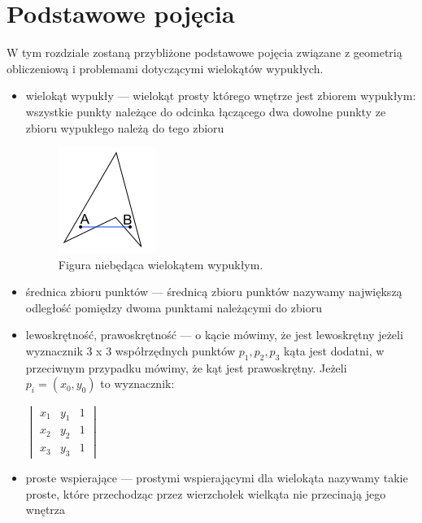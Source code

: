 \documentclass{article}
\begin{document}
\section{Podstawowe pojęcia}
W tym rozdziale zostaną przybliżone podstawowe pojęcia związane z
geometrią obliczeniową i problemami dotyczącymi wielokątów wypukłych.

\begin{itemize}
\item{wielokąt wypukły} --- wielokąt prosty którego wnętrze jest
  zbiorem wypukłym: wszystkie punkty należące do odcinka łączącego dwa
  dowolne punkty ze zbioru wypukłego należą do tego zbioru

  \begin{figure}[htp]
    \centering
    \includegraphics{img/nonconvex}
    \caption{Figura niebędąca wielokątem wypukłym.}
  \end{figure}

\item{średnica zbioru punktów} --- średnicą zbioru punktów nazywamy
  największą odległość pomiędzy dwoma punktami należącymi do zbioru

\item{lewoskrętność, prawoskrętność} --- o kącie mówimy, że jest
  lewoskrętny jeżeli wyznacznik 3 x 3 współrzędnych punktów $p_1, p_2,
  p_3$ kąta jest dodatni, w przeciwnym przypadku mówimy, że kąt jest
  prawoskrętny. Jeżeli $p_i = (x_0, y_0)$ to wyznacznik:

  \begin{center}
    \begin{math}
      \begin{vmatrix}
        x_1 & y_1 & 1 \\
        x_2 & y_2 & 1 \\
        x_3 & y_3 & 1
      \end{vmatrix}
    \end{math}
  \end{center}

\item{proste wspierające} --- prostymi wspierającymi dla wielokąta
  nazywamy takie proste, które przechodząc przez wierzchołek wielkąta
  nie przecinają jego wnętrza


\end{itemize}
\end{document}
